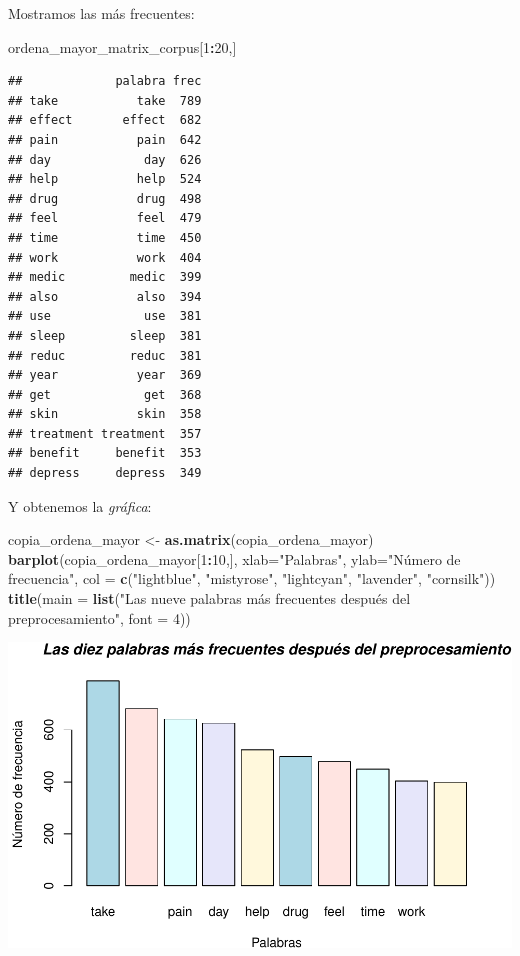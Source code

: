 \documentclass[spanish,]{article}
\newenvironment{Shaded}{\begin{snugshade}}{\end{snugshade}}
\newcommand{\KeywordTok}[1]{\textcolor[rgb]{0.13,0.29,0.53}{\textbf{#1}}}
\newcommand{\DataTypeTok}[1]{\textcolor[rgb]{0.13,0.29,0.53}{#1}}
\newcommand{\DecValTok}[1]{\textcolor[rgb]{0.00,0.00,0.81}{#1}}
\newcommand{\StringTok}[1]{\textcolor[rgb]{0.31,0.60,0.02}{#1}}
\newcommand{\OperatorTok}[1]{\textcolor[rgb]{0.81,0.36,0.00}{\textbf{#1}}}
\newcommand{\NormalTok}[1]{#1}
\begin{document}
Mostramos las más frecuentes:

\begin{Shaded}
\begin{Highlighting}[]
\NormalTok{ordena_mayor_matrix_corpus[}\DecValTok{1}\OperatorTok{:}\DecValTok{20}\NormalTok{,]}
\end{Highlighting}
\end{Shaded}

\begin{verbatim}
##             palabra frec
## take           take  789
## effect       effect  682
## pain           pain  642
## day             day  626
## help           help  524
## drug           drug  498
## feel           feel  479
## time           time  450
## work           work  404
## medic         medic  399
## also           also  394
## use             use  381
## sleep         sleep  381
## reduc         reduc  381
## year           year  369
## get             get  368
## skin           skin  358
## treatment treatment  357
## benefit     benefit  353
## depress     depress  349
\end{verbatim}

Y obtenemos la \emph{gráfica}:

\begin{Shaded}
\begin{Highlighting}[]
\NormalTok{copia_ordena_mayor <-}\StringTok{ }\KeywordTok{as.matrix}\NormalTok{(copia_ordena_mayor)}
\KeywordTok{barplot}\NormalTok{(copia_ordena_mayor[}\DecValTok{1}\OperatorTok{:}\DecValTok{10}\NormalTok{,],  }\DataTypeTok{xlab=}\StringTok{"Palabras"}\NormalTok{, }\DataTypeTok{ylab=}\StringTok{"Número de frecuencia"}\NormalTok{,}
        \DataTypeTok{col =} \KeywordTok{c}\NormalTok{(}\StringTok{"lightblue"}\NormalTok{, }\StringTok{"mistyrose"}\NormalTok{, }\StringTok{"lightcyan"}\NormalTok{,}
                \StringTok{"lavender"}\NormalTok{, }\StringTok{"cornsilk"}\NormalTok{))}
\KeywordTok{title}\NormalTok{(}\DataTypeTok{main =} \KeywordTok{list}\NormalTok{(}\StringTok{"Las nueve palabras más frecuentes después del preprocesamiento"}\NormalTok{, }\DataTypeTok{font =} \DecValTok{4}\NormalTok{))}
\end{Highlighting}
\end{Shaded}

\includegraphics{practica-original_files/figure-latex/unnamed-chunk-74-1.pdf}
\end{document}

